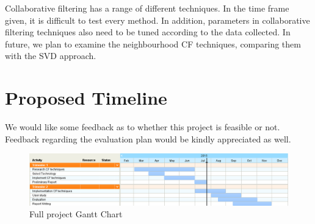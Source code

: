 Collaborative filtering has a range of different techniques. In the time frame given, it is difficult to test every method. In addition, parameters in collaborative filtering techniques also need to be tuned according to the data collected. In future, we plan to examine the neighbourhood CF techniques, comparing them with the SVD approach.

\section{Proposed Timeline}

We would like some feedback as to whether this project is feasible or not. Feedback regarding the evaluation plan would be kindly appreciated as well. 

\begin{figure}
\centering
\includegraphics[scale=0.62]{gantt}
\caption{Full project Gantt Chart}
\label{fig:my_label}
\end{figure}

